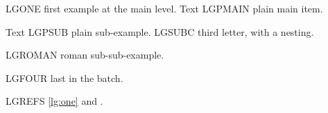 

\begin{exe}
\ex\label{lg:one} LGONE first example at the main level.
\ex Text LGPMAIN plain main item.
 \begin{xlist}
 \ex Text LGPSUB plain sub-example.
 \ex LGSUBC third letter, with a nesting.
  \begin{xlist}
  \ex LGROMAN roman sub-sub-example.
  \end{xlist}
 \end{xlist}
\ex LGFOUR last in the batch.
\end{exe}

LGREFS \ref{lg:one} and \Last.

